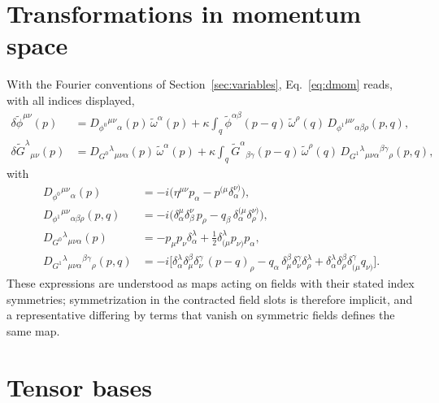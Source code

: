 \documentclass[prd,aps,preprint,superscriptaddress,nofootinbib,amsmath,amssymb,eqsecnum]{revtex4-2}
\newcommand{\tomega}{\tilde{\omega}}
\newcommand{\p}{\tilde{\phi}}
\newcommand{\G}{\tilde{G}}
\newcommand{\ip}[1]{\int_{#1}}
\begin{document}
\section{Transformations in momentum space}
\label{app:momentum}

With the Fourier conventions of Section~\ref{sec:variables}, Eq.~\eqref{eq:dmom} reads, with
all indices displayed,
\begin{align}
\delta\p^{\mu\nu}(p)&=D_{\phi^0}{}^{\mu\nu}{}_{\alpha}(p)\,\tomega^\alpha(p)
+\kappa\ip{q}\p^{\alpha\beta}(p-q)\,\tomega^\rho(q)\,D_{\phi^1}{}^{\mu\nu}{}_{\alpha\beta\rho}(p,q),\\
\delta\G^{\lambda}{}_{\mu\nu}(p)&=D_{G^0}{}^{\lambda}{}_{\mu\nu\alpha}(p)\,\tomega^\alpha(p)
+\kappa\ip{q}\G^{\alpha}{}_{\beta\gamma}(p-q)\,\tomega^\rho(q)\,
D_{G^1}{}^{\lambda}{}_{\mu\nu\alpha}{}^{\beta\gamma}{}_{\rho}(p,q),
\end{align}
with
\begin{align}
D_{\phi^0}{}^{\mu\nu}{}_{\alpha}(p)&=-i\big(\eta^{\mu\nu}p_\alpha-p^{(\mu}\delta^{\nu)}_{\alpha}\big),\\
D_{\phi^1}{}^{\mu\nu}{}_{\alpha\beta\rho}(p,q)&=-i\big(\delta^{\mu}_{\alpha}\delta^{\nu}_{\beta}\,p_\rho
-q_\beta\,\delta^{(\mu}_{\alpha}\delta^{\nu)}_{\rho}\big),\\
D_{G^0}{}^{\lambda}{}_{\mu\nu\alpha}(p)&=-p_\mu p_\nu\delta^{\lambda}_{\alpha}
+\tfrac12\delta^{\lambda}_{(\mu}p_{\nu)}p_\alpha,\\
D_{G^1}{}^{\lambda}{}_{\mu\nu\alpha}{}^{\beta\gamma}{}_{\rho}(p,q)&=-i\big[
\delta^{\lambda}_{\alpha}\delta^{\beta}_{\mu}\delta^{\gamma}_{\nu}\,(p-q)_\rho
-q_\alpha\,\delta^{\beta}_{\mu}\delta^{\gamma}_{\nu}\delta^{\lambda}_{\rho}
+\delta^{\lambda}_{\alpha}\delta^{\beta}_{\rho}\delta^{\gamma}_{(\mu}q_{\nu)}\big].
\end{align}
These expressions are understood as maps acting on fields with their stated index
symmetries; symmetrization in the contracted field slots is therefore implicit, and a
representative differing by terms that vanish on symmetric fields defines the same map.

\section{Tensor bases}
\label{app:bases}
\end{document}
